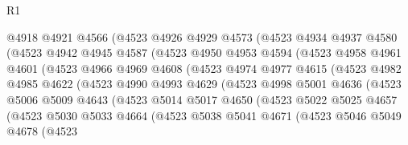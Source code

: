 \begin{lexlean}{R1}
\begin{coremodule}
                @4918
                @4921
                @4566
                (@4523
                  @4926
                  @4929
                  @4573
                  (@4523
                    @4934
                    @4937
                    @4580
                    (@4523
                      @4942
                      @4945
                      @4587
                      (@4523
                        @4950
                        @4953
                        @4594
                        (@4523
                          @4958
                          @4961
                          @4601
                          (@4523
                            @4966
                            @4969
                            @4608
                            (@4523
                              @4974
                              @4977
                              @4615
                              (@4523
                                @4982
                                @4985
                                @4622
                                (@4523
                                  @4990
                                  @4993
                                  @4629
                                  (@4523
                                    @4998
                                    @5001
                                    @4636
                                    (@4523
                                      @5006
                                      @5009
                                      @4643
                                      (@4523
                                        @5014
                                        @5017
                                        @4650
                                        (@4523
                                          @5022
                                          @5025
                                          @4657
                                          (@4523
                                            @5030
                                            @5033
                                            @4664
                                            (@4523
                                              @5038
                                              @5041
                                              @4671
                                              (@4523
                                                @5046
                                                @5049
                                                @4678
                                                (@4523

\end{coremodule}
\end{lexlean}
